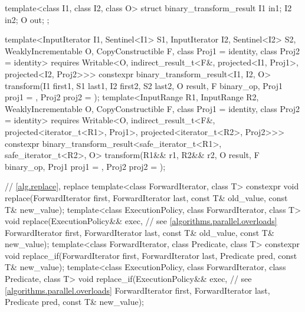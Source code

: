 \begin{codeblock}
{{    template<class I1, class I2, class O>
    struct binary_transform_result {
      I1 in1;
      I2 in2;
      O  out;
    };

    template<InputIterator I1, Sentinel<I1> S1, InputIterator I2, Sentinel<I2> S2,
        WeaklyIncrementable O, CopyConstructible F, class Proj1 = identity,
        class Proj2 = identity>
      requires Writable<O, indirect_result_t<F&, projected<I1, Proj1>,
        projected<I2, Proj2>>>
      constexpr binary_transform_result<I1, I2, O>
        transform(I1 first1, S1 last1, I2 first2, S2 last2, O result,
                  F binary_op, Proj1 proj1 = {}, Proj2 proj2 = {});
    template<InputRange R1, InputRange R2, WeaklyIncrementable O,
        CopyConstructible F, class Proj1 = identity, class Proj2 = identity>
      requires Writable<O, indirect_result_t<F&,
        projected<iterator_t<R1>, Proj1>, projected<iterator_t<R2>, Proj2>>>
      constexpr binary_transform_result<safe_iterator_t<R1>, safe_iterator_t<R2>, O>
        transform(R1&& r1, R2&& r2, O result,
                  F binary_op, Proj1 proj1 = {}, Proj2 proj2 = {});
  }

  // \ref{alg.replace}, replace
  template<class ForwardIterator, class T>
    constexpr void replace(ForwardIterator first, ForwardIterator last,
                           const T& old_value, const T& new_value);
  template<class ExecutionPolicy, class ForwardIterator, class T>
    void replace(ExecutionPolicy&& exec, // see \ref{algorithms.parallel.overloads}
                 ForwardIterator first, ForwardIterator last,
                 const T& old_value, const T& new_value);
  template<class ForwardIterator, class Predicate, class T>
    constexpr void replace_if(ForwardIterator first, ForwardIterator last,
                              Predicate pred, const T& new_value);
  template<class ExecutionPolicy, class ForwardIterator, class Predicate, class T>
    void replace_if(ExecutionPolicy&& exec, // see \ref{algorithms.parallel.overloads}
                    ForwardIterator first, ForwardIterator last,
                    Predicate pred, const T& new_value);

}
\end{codeblock}

